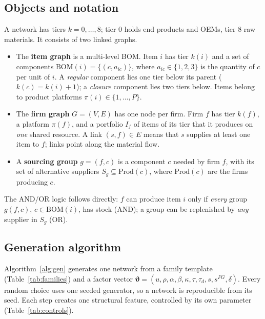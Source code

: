 \documentclass{ifacconf}
\begin{document}
\subsection{Objects and notation}
A network has tiers $k=0,\dots,8$; tier 0 holds end products and OEMs, tier 8 raw materials. It consists of two linked graphs.
\begin{itemize}
\item The \textbf{item graph} is a multi-level BOM. Item $i$ has tier $k(i)$ and a set of components $\mathrm{BOM}(i)=\{(c,a_{ic})\}$, where $a_{ic}\in\{1,2,3\}$ is the quantity of $c$ per unit of $i$. A \emph{regular} component lies one tier below its parent ($k(c)=k(i)+1$); a \emph{closure} component lies two tiers below. Items belong to product platforms $\pi(i)\in\{1,\dots,P\}$.
\item The \textbf{firm graph} $G=(V,E)$ has one node per firm. Firm $f$ has tier $k(f)$, a platform $\pi(f)$, and a portfolio $I_f$ of items of its tier that it produces on \emph{one} shared resource. A link $(s,f)\in E$ means that $s$ supplies at least one item to $f$; links point along the material flow.
\item A \textbf{sourcing group} $g=(f,c)$ is a component $c$ needed by firm $f$, with its set of alternative suppliers $S_g\subseteq\mathrm{Prod}(c)$, where $\mathrm{Prod}(c)$ are the firms producing $c$.
\end{itemize}
The AND/OR logic follows directly: $f$ can produce item $i$ only if \emph{every} group $g(f,c)$, $c\in\mathrm{BOM}(i)$, has stock (AND); a group can be replenished by \emph{any} supplier in $S_g$ (OR).

\subsection{Generation algorithm}
Algorithm~\ref{alg:gen} generates one network from a family template (Table~\ref{tab:families}) and a factor vector $\boldsymbol{\vartheta}=(u,\rho,\alpha,\beta,\kappa,\tau,\tau_d,s,s^{FG},\delta)$. Every random choice uses one seeded generator, so a network is reproducible from its seed. Each step creates one structural feature, controlled by its own parameter (Table~\ref{tab:controls}).
\end{document}

